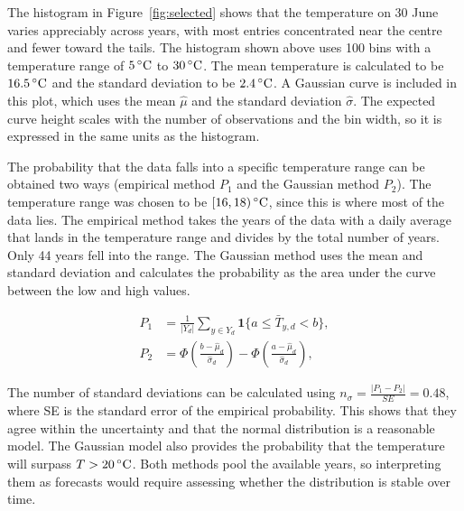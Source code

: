 The histogram in Figure~\ref{fig:selected} shows that the temperature on 30 June varies appreciably across years, with most entries concentrated near the centre and fewer toward the tails. The histogram shown above uses 100 bins with a temperature range of \(5\,{}^\circ\mathrm{C}\) to \(30\,{}^\circ\mathrm{C}\). The mean temperature is calculated to be \(16.5\,{}^\circ\mathrm{C}\) and the standard deviation to be \(2.4\,{}^\circ\mathrm{C}\). A Gaussian curve is included in this plot, which uses the mean \(\hat\mu\) and the standard deviation \(\hat\sigma\). The expected curve height scales with the number of observations and the bin width, so it is expressed in the same units as the histogram.

The probability that the data falls into a specific temperature range can be obtained two ways (empirical method $P_1$ and the Gaussian method $P_2$). The temperature range was chosen to be \([16,18)\,{}^\circ\mathrm{C}\), since this is where most of the data lies. The empirical method takes the years of the data with a daily average that lands in the temperature range and divides by the total number of years. Only 44 years fell into the range. The Gaussian method uses the mean and standard deviation and calculates the probability as the area under the curve between the low and high values.

\begin{align}
  P_1
    &= \frac{1}{|Y_d|} \sum_{y \in Y_d}
       \mathbf{1}\{a \le \bar T_{y,d} < b\}, \\[4pt]
  P_2
    &= \Phi\!\left(\frac{b-\hat\mu_d}{\hat\sigma_d}\right)
     - \Phi\!\left(\frac{a-\hat\mu_d}{\hat\sigma_d}\right),
\end{align}

The number of standard deviations can be calculated using $n_\sigma = \frac{|P_1 -P_2|}{SE} = 0.48$, where SE is the standard error of the empirical probability. This shows that they agree within the uncertainty and that the normal distribution is a reasonable model. The Gaussian model also provides the probability that the temperature will surpass \(T>20\,{}^\circ\mathrm{C}\). Both methods pool the available years, so interpreting them as forecasts would require assessing whether the distribution is stable over time.

